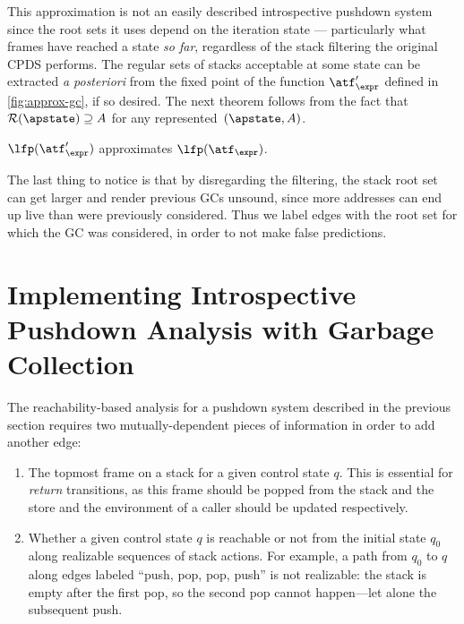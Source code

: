 This approximation is not an easily described introspective pushdown system since the root sets it uses depend on the iteration state --- particularly what frames have reached a state \emph{so far}, regardless of the stack filtering the original CPDS performs.
The regular sets of stacks acceptable at some state can be extracted
\emph{a posteriori} from the fixed point of the function $\atf_\expr'$
defined in \autoref{fig:approx-gc}, if so desired.
The next theorem follows from the fact that ${\mathcal R}(\apstate)
\supseteq A$ for any represented~$(\apstate, A)$.

\begin{theorem}\label{thm:approx-gc-sound}
  $\lfp(\atf_\expr')$ approximates $\lfp(\atf_\expr)$.
\end{theorem}


The last thing to notice is that by disregarding the filtering, the stack root set can get larger and render previous GCs unsound, since more addresses can end up live than were previously considered.
Thus we label edges with the root set for which the GC was considered,
in order to not make false predictions.


\section{Implementing Introspective Pushdown Analysis with Garbage
  Collection}
\label{sec:implementation}

The reachability-based analysis for a pushdown system described in
the previous section requires two mutually-dependent pieces
of information in order to add another edge:

\begin{enumerate}
\item The topmost frame on a stack for a given control state $q$. This is
essential for \emph{return} transitions, as this frame should be
popped from the stack and the store and the environment of a caller
should be updated respectively.

\item Whether a given control state $q$ is reachable or not from the
initial state $q_0$ along realizable sequences of stack actions.
For example, a path from $q_0$ to $q$ along edges labeled ``push, pop, pop, push''
is not realizable: the stack is empty after the first pop, so the second pop
cannot happen---let alone the subsequent push.



\end{enumerate}

